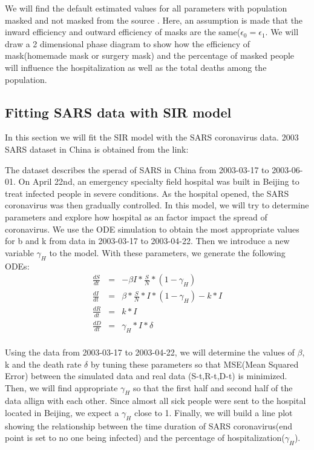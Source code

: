 \documentclass{article}
\begin{document}
We will find the default estimated values for all parameters with population masked and not masked from the source \cite{Steff2020mask}.
Here, an assumption is made that the inward efficiency and outward efficiency of masks are the same($\epsilon_{0} = \epsilon_{1}$. We will draw a 2 dimensional phase diagram to show how the efficiency of mask(homemade mask or surgery mask) and the percentage of masked people will influence the hospitalization as well as the total deaths among the population.






\subsection{Fitting SARS data with SIR model}
In this section we will fit the SIR model with the SARS coronavirus data. 2003 SARS dataset in China is obtained from the link:\cite{SARSsource}

The dataset describes the sperad of SARS in China from 2003-03-17 to 2003-06-01. On April 22nd, an emergency specialty field hospital was built in Beijing to treat infected people in severe conditions. As the hospital opened, the SARS coronavirus was then gradually controlled. In this model, we will try to determine parameters and explore how hospital as an factor impact the spread of coronavirus. We use the ODE simulation to obtain the most appropriate values for b and k from data in 2003-03-17 to 2003-04-22. Then we introduce a new variable $\gamma_{H}$ to the model. With these parameters, we generate the following ODEs:
\begin{eqnarray}
  \frac{dS}{dt} &=& -\beta I*\frac{S}{N}*(1-\gamma_{H})\\
  \frac{dI}{dt} &=& \beta *\frac{S}{N}*I*(1-\gamma_{H})- k*I\\
  \frac{dR}{dt} &=& k*I\\
  \frac{dD}{dt} &=& \gamma_{H}*I*\delta\\
\end{eqnarray}

Using the data from 2003-03-17 to 2003-04-22, we will determine the values of $\beta$, k and the death rate $\delta$ by tuning these parameters so that MSE(Mean Squared Error) between the simulated data and real data (S-t,R-t,D-t) is minimized. Then, we will find appropriate $\gamma_{H}$ so that the first half and second half of the data allign with each other. Since almost all sick people were sent to the hospital located in Beijing, we expect a $\gamma_{H}$ close to 1.
Finally, we will build a line plot showing the relationship between the time duration of SARS coronavirus(end point is set to no one being infected) and the percentage of hospitalization($\gamma_{H}$).
\end{document}
